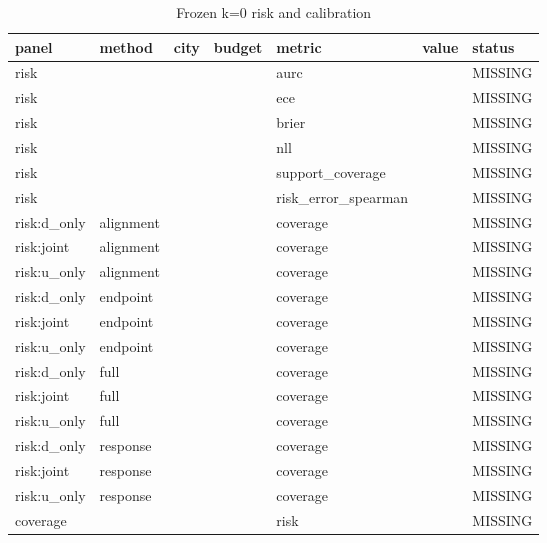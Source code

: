 \begin{longtable}{lllllll}
\caption{Frozen k=0 risk and calibration}\\
\toprule
panel & method & city & budget & metric & value & status \\
\midrule\endhead
risk &  &  &  & aurc &  & MISSING \\
risk &  &  &  & ece &  & MISSING \\
risk &  &  &  & brier &  & MISSING \\
risk &  &  &  & nll &  & MISSING \\
risk &  &  &  & support\_coverage &  & MISSING \\
risk &  &  &  & risk\_error\_spearman &  & MISSING \\
risk:d\_only & alignment &  &  & coverage &  & MISSING \\
risk:joint & alignment &  &  & coverage &  & MISSING \\
risk:u\_only & alignment &  &  & coverage &  & MISSING \\
risk:d\_only & endpoint &  &  & coverage &  & MISSING \\
risk:joint & endpoint &  &  & coverage &  & MISSING \\
risk:u\_only & endpoint &  &  & coverage &  & MISSING \\
risk:d\_only & full &  &  & coverage &  & MISSING \\
risk:joint & full &  &  & coverage &  & MISSING \\
risk:u\_only & full &  &  & coverage &  & MISSING \\
risk:d\_only & response &  &  & coverage &  & MISSING \\
risk:joint & response &  &  & coverage &  & MISSING \\
risk:u\_only & response &  &  & coverage &  & MISSING \\
coverage &  &  &  & risk &  & MISSING \\
\bottomrule
\end{longtable}
